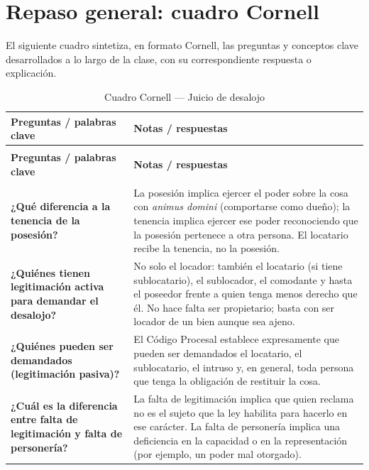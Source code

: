 \documentclass[12pt,oneside]{book}
\begin{document}
\chapter{Repaso general: cuadro Cornell}
\label{cap:cornell}

El siguiente cuadro sintetiza, en formato Cornell, las preguntas y conceptos clave desarrollados a lo largo de la clase, con su correspondiente respuesta o explicación.

\begin{longtable}{
    >{\raggedright\arraybackslash}p{}
    >{\raggedright\arraybackslash}p{}
}
\caption{Cuadro Cornell --- Juicio de desalojo} \\
\toprule
\textbf{Preguntas / palabras clave} & \textbf{Notas / respuestas} \\
\midrule
\endfirsthead

\multicolumn{2}{c}{\textit{(continuación)}} \\
\toprule
\textbf{Preguntas / palabras clave} & \textbf{Notas / respuestas} \\
\midrule
\endhead

\midrule
\multicolumn{2}{r}{\textit{continúa en la página siguiente}} \\
\endfoot

\bottomrule
\endlastfoot

\textbf{¿Qué diferencia a la tenencia de la posesión?} &
La posesión implica ejercer el poder sobre la cosa con \textit{animus domini} (comportarse como dueño); la tenencia implica ejercer ese poder reconociendo que la posesión pertenece a otra persona. El locatario recibe la tenencia, no la posesión. \\

\textbf{¿Quiénes tienen legitimación activa para demandar el desalojo?} &
No solo el locador: también el locatario (si tiene sublocatario), el sublocador, el comodante y hasta el poseedor frente a quien tenga menos derecho que él. No hace falta ser propietario; basta con ser locador de un bien aunque sea ajeno. \\

\textbf{¿Quiénes pueden ser demandados (legitimación pasiva)?} &
El Código Procesal establece expresamente que pueden ser demandados el locatario, el sublocatario, el intruso y, en general, toda persona que tenga la obligación de restituir la cosa. \\

\textbf{¿Cuál es la diferencia entre falta de legitimación y falta de personería?} &
La falta de legitimación implica que quien reclama no es el sujeto que la ley habilita para hacerlo en ese carácter. La falta de personería implica una deficiencia en la capacidad o en la representación (por ejemplo, un poder mal otorgado). \\


\end{longtable}
\end{document}
